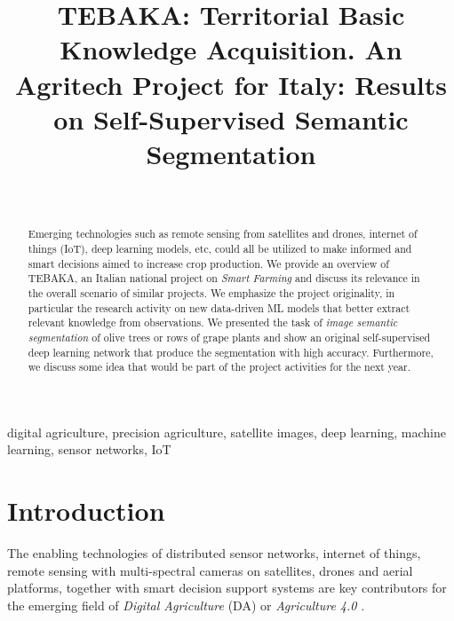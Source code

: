 \documentclass[comsoc,final]{IEEEtran}
\begin{document}

\title{\textsc{TEBAKA}: Territorial Basic Knowledge Acquisition. An Agritech Project for Italy: Results on Self-Supervised Semantic Segmentation}

\author{\\ 
}

\maketitle



\begin{abstract}
Emerging technologies such as remote sensing from satellites and drones, 
internet of things (IoT), deep learning models, etc, could all be utilized to make informed and smart decisions aimed to increase crop production. We provide an overview of TEBAKA, an Italian national project on \emph{Smart Farming} and discuss its relevance in the overall scenario of similar projects. We emphasize the project originality, in particular the research activity on new data-driven ML models that better extract relevant knowledge from observations. We presented the task of \emph{image semantic segmentation} of olive trees or rows of grape plants and show an original self-supervised deep learning network that produce the segmentation with high accuracy. Furthermore, we discuss some idea that would be part of the project activities for the next year.
\end{abstract}

\begin{IEEEkeywords}
digital agriculture, precision agriculture, satellite images, deep learning, machine learning, sensor networks, IoT
\end{IEEEkeywords}


\section{Introduction}

The enabling technologies of distributed sensor networks, internet of things, remote sensing with multi-spectral cameras on satellites, drones and aerial platforms, together with smart decision support systems are key contributors for the emerging field of \emph{Digital Agriculture} (DA) or \emph{Agriculture 4.0} \cite{de2018agriculture}. 
\end{document}
